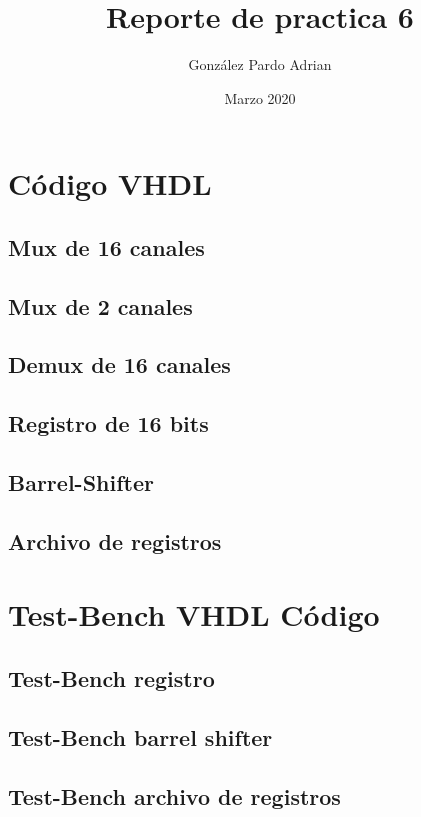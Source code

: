 \documentclass[8pt,executivepaper]{article}
\author{González Pardo Adrian}
\date{Marzo 2020}
\title{Reporte de practica 6}
\begin{document}
\maketitle
\section{Código VHDL}
\subsection{Mux de 16 canales}

\subsection{Mux de 2 canales}

\subsection{Demux de 16 canales}

\subsection{Registro de 16 bits}

\subsection{Barrel-Shifter}

\subsection{Archivo de registros}

\section{Test-Bench VHDL Código}
\subsection{Test-Bench registro}

\subsection{Test-Bench barrel shifter}

\subsection{Test-Bench archivo de registros}

\end{document}
